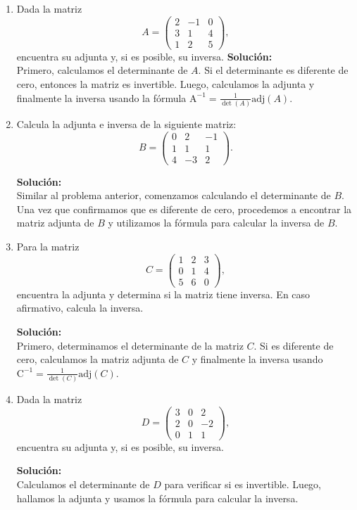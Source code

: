 \documentclass[a4paper, 12pt]{article}
\begin{document}
\begin{enumerate}
    \item Dada la matriz
    \[
    A = \begin{pmatrix}
    2 & -1 & 0 \\
    3 & 1 & 4 \\
    1 & 2 & 5
    \end{pmatrix},
    \]
    encuentra su adjunta y, si es posible, su inversa.
    \newline
    \textbf{Solución:} \\
    Primero, calculamos el determinante de \(A\). Si el determinante es diferente de cero, entonces la matriz es invertible. Luego, calculamos la adjunta y finalmente la inversa usando la fórmula \(\text{A}^{-1} = \frac{1}{\det(A)} \text{adj}(A)\).


    \item Calcula la adjunta e inversa de la siguiente matriz:
    \[
    B = \begin{pmatrix}
    0 & 2 & -1 \\
    1 & 1 & 1 \\
    4 & -3 & 2
    \end{pmatrix}.
    \]
    
    \textbf{Solución:} \\
    Similar al problema anterior, comenzamos calculando el determinante de \(B\). Una vez que confirmamos que es diferente de cero, procedemos a encontrar la matriz adjunta de \(B\) y utilizamos la fórmula para calcular la inversa de \(B\).

    
    \item Para la matriz
    \[
    C = \begin{pmatrix}
    1 & 2 & 3 \\
    0 & 1 & 4 \\
    5 & 6 & 0
    \end{pmatrix},
    \]
    encuentra la adjunta y determina si la matriz tiene inversa. En caso afirmativo, calcula la inversa.
    
    \textbf{Solución:} \\
    Primero, determinamos el determinante de la matriz \(C\). Si es diferente de cero, calculamos la matriz adjunta de \(C\) y finalmente la inversa usando \(\text{C}^{-1} = \frac{1}{\det(C)} \text{adj}(C)\).
    
    
    \item Dada la matriz
    \[
    D = \begin{pmatrix}
    3 & 0 & 2 \\
    2 & 0 & -2 \\
    0 & 1 & 1
    \end{pmatrix},
    \]
    encuentra su adjunta y, si es posible, su inversa.
    
    \textbf{Solución:} \\
    Calculamos el determinante de \(D\) para verificar si es invertible. Luego, hallamos la adjunta y usamos la fórmula para calcular la inversa.


\end{enumerate}
\end{document}
